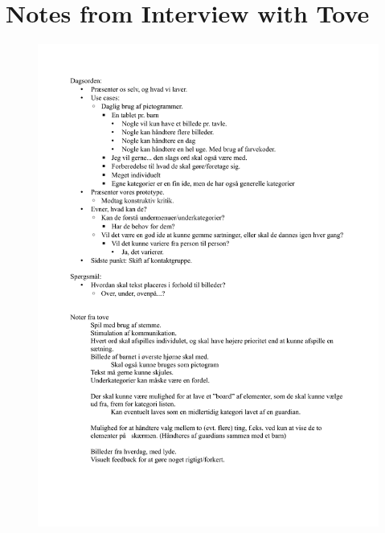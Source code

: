 \chapter{Notes from Interview with Tove}
\label{appendice:notater_fra_tove}


\begin{figure}[htbp]
	\centering
		\includegraphics{input/appendices/notater_fra_tove.pdf}
	\label{fig:notater_fra_tove}
\end{figure}
